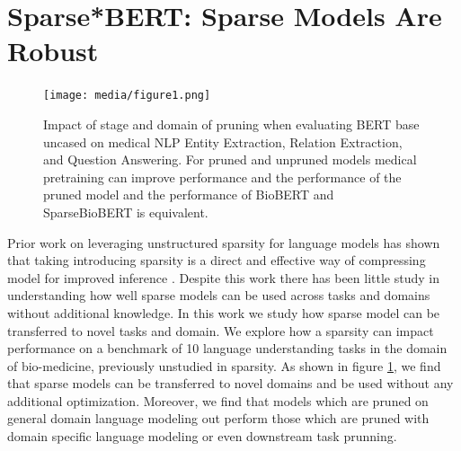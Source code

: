 \section{Sparse*BERT: Sparse Models Are Robust}
\begin{figure}[!htb]
    \centering
    \texttt{[image: media/figure1.png]}
    \vspace{-1.2em}
\caption{Impact of stage and domain of pruning when evaluating BERT base uncased on medical NLP Entity Extraction, Relation Extraction, and Question Answering. For pruned and unpruned models medical pretraining can improve performance and the performance of the pruned model and the performance of BioBERT and SparseBioBERT is equivalent.}
\label{fig:sparse_transfer_categorical}
\end{figure}
Prior work on leveraging unstructured sparsity for language models has shown that taking introducing sparsity is a direct and effective way of compressing model for improved inference \cite{Zafrir2021PruneOF} \cite{Kurti2022TheOB}. Despite this work there has been little study in understanding how well sparse models can be used across tasks and domains without additional knowledge. In this work we study how sparse model can be transferred to novel tasks and domain. We explore how a sparsity can impact performance on a benchmark of 10 language understanding tasks in the domain of bio-medicine, previously unstudied in sparsity. As shown in figure \ref{fig:sparse_transfer_categorical}, we find that sparse models can be transferred to novel domains and be used without any additional optimization. Moreover, we find that models which are pruned on general domain language modeling out perform those which are pruned with domain specific language modeling or even downstream task prunning. 
